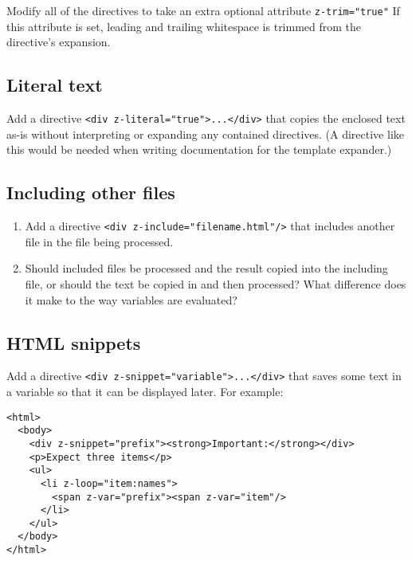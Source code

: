 \documentclass[krantzl]{krantz}
\begin{document}
Modify all of the directives to take an extra optional attribute \texttt{z-trim="true"}
If this attribute is set,
leading and trailing whitespace is trimmed from the directive's expansion.

\subsection*{Literal text}


Add a directive \texttt{<div z-literal="true">...</div>} that copies the enclosed text as-is
without interpreting or expanding any contained directives.
(A directive like this would be needed when writing documentation for the template expander.)

\subsection*{Including other files}

\begin{enumerate}

\item 

Add a directive \texttt{<div z-include="filename.html"/>} that includes another file
    in the file being processed.



\item 

Should included files be processed and the result copied into the including file,
    or should the text be copied in and then processed?
    What difference does it make to the way variables are evaluated?



\end{enumerate}

\subsection*{HTML snippets}


Add a directive \texttt{<div z-snippet="variable">...</div>} that saves some text in a variable
so that it can be displayed later.
For example:

\begin{lstlisting}[frame=single,frameround=tttt]
<html>
  <body>
    <div z-snippet="prefix"><strong>Important:</strong></div>
    <p>Expect three items</p>
    <ul>
      <li z-loop="item:names">
        <span z-var="prefix"><span z-var="item"/>
      </li>
    </ul>
  </body>
</html>
\end{lstlisting}
\end{document}
